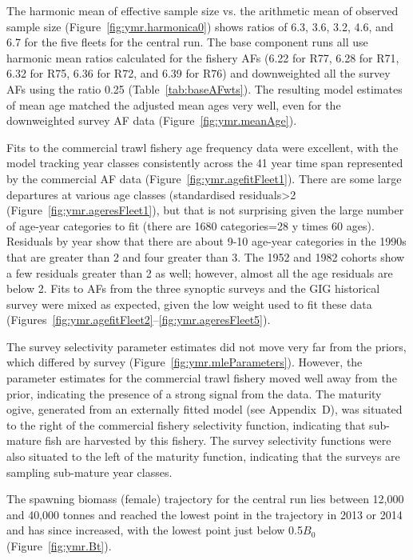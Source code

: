 \documentclass[11pt]{book}
\newcommand{\AppBio}{Appendix~D}
\begin{document}
The harmonic mean of effective sample size vs. the arithmetic mean of observed sample size (Figure~\ref{fig:ymr.harmonica0}) shows ratios of 6.3, 3.6, 3.2, 4.6, and 6.7 for the five fleets for the central run.
The base component runs all use harmonic mean ratios calculated for the fishery AFs (6.22 for R77, 6.28 for R71, 6.32 for R75, 6.36 for R72, and 6.39 for R76) and downweighted all the survey AFs using the ratio 0.25 (Table~\ref{tab:baseAFwts}).
The resulting model estimates of mean age matched the adjusted mean ages very well, even for the downweighted survey AF data (Figure~\ref{fig:ymr.meanAge}).

Fits to the commercial trawl fishery age frequency data were excellent, with the model tracking year classes consistently across the 41 year time span represented by the commercial AF data (Figure~\ref{fig:ymr.agefitFleet1}).
There are some large departures at various age classes (standardised residuals>2 (Figure~\ref{fig:ymr.ageresFleet1}), but that is not surprising given the large number of age-year categories to fit (there are 1680 categories=28 y times 60 ages).
Residuals by year show that there are about 9-10 age-year categories in the 1990s that are greater than 2 and four greater than 3.
The 1952 and 1982 cohorts show a few residuals greater than 2 as well; however, almost all the age residuals are below 2.
Fits to AFs from the three synoptic surveys and the GIG historical survey were mixed as expected, given the low weight used to fit these data (Figures~\ref{fig:ymr.agefitFleet2}--\ref{fig:ymr.ageresFleet5}).

The survey selectivity parameter estimates did not move very far from the priors, which differed by survey  (Figure~\ref{fig:ymr.mleParameters}).
However, the parameter estimates for the commercial trawl fishery moved well away from the prior, indicating the presence of a strong signal from the data. 
The maturity ogive, generated from an externally fitted model (see \AppBio), was situated to the right of the commercial fishery selectivity function, indicating that sub-mature fish are harvested by this fishery.
The survey selectivity functions were also situated to the left of the maturity function, indicating that the surveys are sampling sub-mature year classes.

The spawning biomass (female) trajectory for the central run lies between 12,000 and 40,000 tonnes and reached the lowest point in the trajectory in 2013 or 2014 and has since increased, with the lowest point just below 0.5$B_0$ (Figure~\ref{fig:ymr.Bt}).
\end{document}
